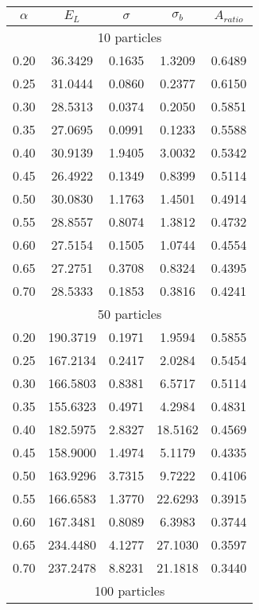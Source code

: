 \documentclass[
    a4paper, aps, twocolumn, floatfix, superscriptaddress,
    nofootinbib]{revtex4-1}
\begin{document}
\begin{table}[H]
{\begin{ruledtabular}
\begin{tabular}{ccccc}
$\alpha$ & $E_L$   & $\sigma$ & $\sigma_b$ & $A_{ratio}$ \\
\hline
    \multicolumn{5}{c}{10 particles} \\              
\hline
0.20     & 36.3429 & 0.1635   & 1.3209     & 0.6489      \\
0.25     & 31.0444 & 0.0860   & 0.2377     & 0.6150       \\
0.30     & 28.5313 & 0.0374   & 0.2050     & 0.5851      \\
0.35     & 27.0695 & 0.0991   & 0.1233     & 0.5588       \\
0.40     & 30.9139 & 1.9405   & 3.0032     & 0.5342       \\
0.45     & 26.4922 & 0.1349   & 0.8399     & 0.5114         \\
0.50     & 30.0830 & 1.1763   & 1.4501     & 0.4914     \\
0.55     & 28.8557 & 0.8074   & 1.3812     & 0.4732      \\
0.60     & 27.5154 & 0.1505   & 1.0744     & 0.4554     \\
0.65     & 27.2751 & 0.3708   & 0.8324     & 0.4395       \\
0.70     & 28.5333 & 0.1853   & 0.3816     & 0.4241      \\
\hline
\multicolumn{5}{c}{50 particles}               \\
\hline
0.20     & 190.3719 & 0.1971   & 1.9594     & 0.5855      \\
0.25     & 167.2134 & 0.2417   & 2.0284     & 0.5454       \\
0.30     & 166.5803 & 0.8381   & 6.5717     & 0.5114    \\
0.35     & 155.6323 & 0.4971   & 4.2984     & 0.4831   \\
0.40     & 182.5975 & 2.8327   & 18.5162    & 0.4569      \\
0.45     & 158.9000 & 1.4974   & 5.1179     & 0.4335           \\
0.50     &  163.9296 & 3.7315   & 9.7222     & 0.4106     \\
0.55     & 166.6583 & 1.3770   & 22.6293    & 0.3915     \\
0.60     & 167.3481 & 0.8089   & 6.3983     & 0.3744    \\
0.65     & 234.4480 & 4.1277   & 27.1030    & 0.3597        \\
0.70     & 237.2478 & 8.8231   & 21.1818    & 0.3440          \\
\hline
\multicolumn{5}{c}{100 particles}               \\
\hline


\end{tabular}
\end{ruledtabular}}
\end{table}
\end{document}
